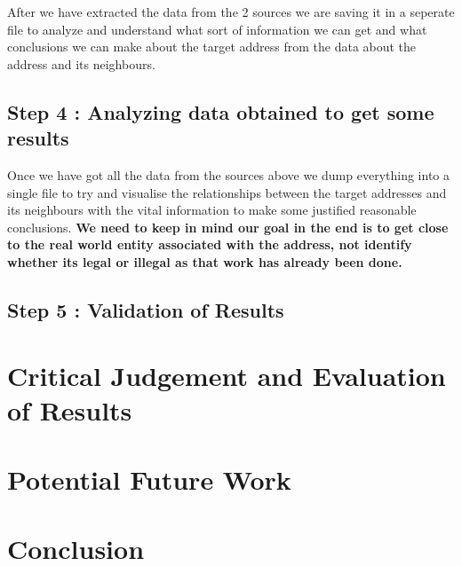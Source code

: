 \documentclass{article}
\begin{document}
        After we have extracted the data from the 2 sources we are saving it in a seperate file to analyze and understand what sort of information we can get and what conclusions we can make about the target address from the data about the address and its neighbours.

\pagebreak

    \subsection{Step 4 : Analyzing data obtained to get some results}
    
        Once we have got all the data from the sources above we dump everything into a single file to try and visualise the relationships between the target addresses and its neighbours with the vital information to make some justified reasonable conclusions. \textbf{We need to keep in mind our goal in the end is to get close to the real world entity associated with the address, not identify whether its legal or illegal as that work has already been done.} 
        
\pagebreak

    \subsection{Step 5 : Validation of Results}
        
        
\pagebreak
\section{Critical Judgement and Evaluation of Results}

\pagebreak
\section{Potential Future Work}

\pagebreak
\section{Conclusion}

\pagebreak

 
\end{document}
